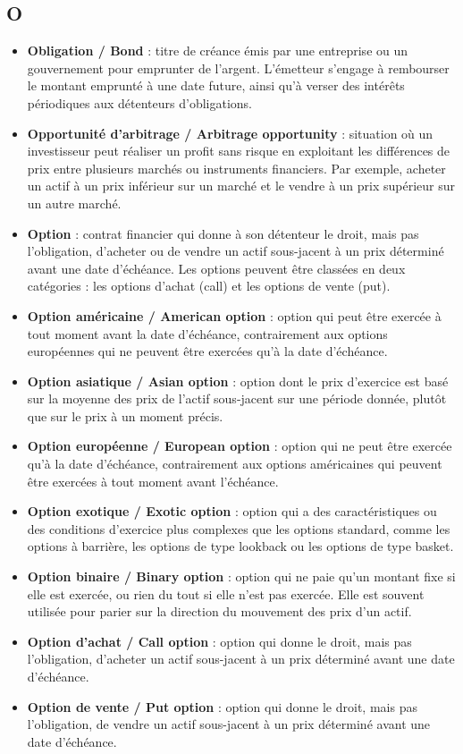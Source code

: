 \documentclass[a4paper,10pt]{article}
\begin{document}
\begin{multicols}{2}
\section*{O}
\begin{itemize}
  \item \textbf{Obligation / Bond} : titre de créance émis par une entreprise ou un gouvernement pour emprunter de l’argent. L’émetteur s’engage à rembourser le montant emprunté à une date future, ainsi qu’à verser des intérêts périodiques aux détenteurs d’obligations.
  \item \textbf{Opportunité d’arbitrage / Arbitrage opportunity} : situation où un investisseur peut réaliser un profit sans risque en exploitant les différences de prix entre plusieurs marchés ou instruments financiers. Par exemple, acheter un actif à un prix inférieur sur un marché et le vendre à un prix supérieur sur un autre marché.
  \item \textbf{Option} : contrat financier qui donne à son détenteur le droit, mais pas l’obligation, d’acheter ou de vendre un actif sous-jacent à un prix déterminé avant une date d’échéance. Les options peuvent être classées en deux catégories : les options d’achat (call) et les options de vente (put).
  \item \textbf{Option américaine / American option} : option qui peut être exercée à tout moment avant la date d’échéance, contrairement aux options européennes qui ne peuvent être exercées qu’à la date d’échéance.
  \item \textbf{Option asiatique / Asian option} : option dont le prix d’exercice est basé sur la moyenne des prix de l’actif sous-jacent sur une période donnée, plutôt que sur le prix à un moment précis.
  \item \textbf{Option européenne / European option} : option qui ne peut être exercée qu’à la date d’échéance, contrairement aux options américaines qui peuvent être exercées à tout moment avant l’échéance.
  \item \textbf{Option exotique / Exotic option} : option qui a des caractéristiques ou des conditions d’exercice plus complexes que les options standard, comme les options à barrière, les options de type lookback ou les options de type basket.
  \item \textbf{Option binaire / Binary option} : option qui ne paie qu’un montant fixe si elle est exercée, ou rien du tout si elle n’est pas exercée. Elle est souvent utilisée pour parier sur la direction du mouvement des prix d’un actif.
  \item \textbf{Option d’achat / Call option} : option qui donne le droit, mais pas l’obligation, d’acheter un actif sous-jacent à un prix déterminé avant une date d’échéance.
  \item \textbf{Option de vente / Put option} : option qui donne le droit, mais pas l’obligation, de vendre un actif sous-jacent à un prix déterminé avant une date d’échéance.
\end{itemize}


\end{multicols}
\end{document}
